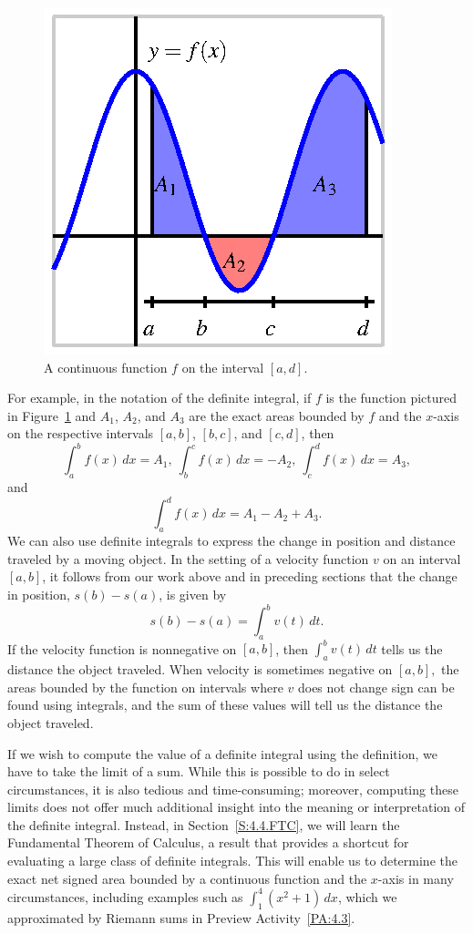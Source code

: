 \begin{figure}[h]
\begin{center}
\includegraphics{figures/4_3_DefIntInterp.eps}
\caption{A continuous function $f$ on the interval $[a,d]$.} \label{F:4.3.DefIntInterp}
\end{center}
\end{figure}
For example, in the notation of the definite integral, if $f$ is the function pictured in Figure~\ref{F:4.3.DefIntInterp} and $A_1$, $A_2$, and $A_3$ are the exact areas bounded by $f$ and the $x$-axis on the respective intervals $[a,b]$, $[b,c]$, and $[c,d]$, then
$$\int_a^b f(x) \, dx = A_1, \ \int_b^c f(x) \, dx = -A_2, \ \int_c^d f(x) \, dx = A_3,$$
and
$$\int_a^d f(x) \, dx = A_1 - A_2 + A_3.$$
We can also use definite integrals to express the change in position and distance traveled by a moving object.  In the setting of a velocity function $v$ on an interval $[a,b]$, it follows from our work above and in preceding sections that the change in position, $s(b) - s(a)$, is given by
$$s(b) - s(a) = \int_a^b v(t) \, dt.$$
If the velocity function is nonnegative on $[a,b]$, then $\int_a^b v(t) \,dt$ tells us the distance the object traveled.  When velocity is sometimes negative on $[a,b],$ the areas bounded by the function on intervals where $v$ does not change sign can be found using integrals, and the sum of these values will tell us the distance the object traveled. 

If we wish to compute the value of a definite integral using the definition, we have to take the limit of a sum.  While this is possible to do in select circumstances, it is also tedious and time-consuming; moreover, computing these limits does not offer much additional insight into the meaning or interpretation of the definite integral.  Instead, in Section~\ref{S:4.4.FTC}, we will learn the Fundamental Theorem of Calculus, a result that provides a shortcut for evaluating a large class of definite integrals.  This will enable us to determine the exact net signed area bounded by a continuous function and the $x$-axis in many circumstances, including examples such as $\int_1^4 (x^2 + 1) \, dx$, which we approximated by Riemann sums in Preview Activity~\ref{PA:4.3}.

